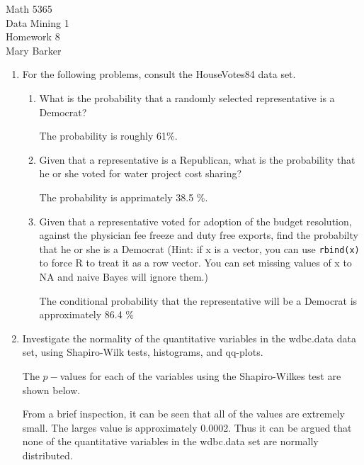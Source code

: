 \documentclass[11pt]{article}
\begin{document}
\noindent\large{Math 5365}\\
\large{Data Mining 1}\\
\large{Homework 8}\\
\large{Mary Barker}
\doublespace
\begin{enumerate}
\item For the following problems, consult the HouseVotes84 data set.
  \begin{enumerate}
    \item What is the probability that a randomly selected representative is a Democrat? 

    The probability is roughly 61\%. 
    \item Given that a representative is a Republican, what is the probability that he or 
          she voted for water project cost sharing? 

          The probability is apprimately 38.5 \%. 
    \item Given that a representative voted for adoption of the budget resolution, 
          against the physician fee freeze and duty free exports, find the probabilty that 
          he or she is a Democrat (Hint: if x is a vector, you can use \verb|rbind(x)| to 
          force R to treat it as a row vector. You can set missing values of x to NA and 
          naive Bayes will ignore them.)

         The conditional probability that the representative will be a Democrat is approximately 
         86.4 \%
  \end{enumerate}

\item Investigate the normality of the quantitative variables in the wdbc.data data set, using 
Shapiro-Wilk tests, histograms, and qq-plots. 

The $p-$values for each of the variables using the Shapiro-Wilkes test are shown below. 

From a brief inspection, it can be seen that all of the values are extremely small. The larges value is 
approximately 0.0002. 
Thus it can be argued that none of the quantitative variables in the wdbc.data set are 
normally distributed. 


\end{enumerate}
\end{document}
